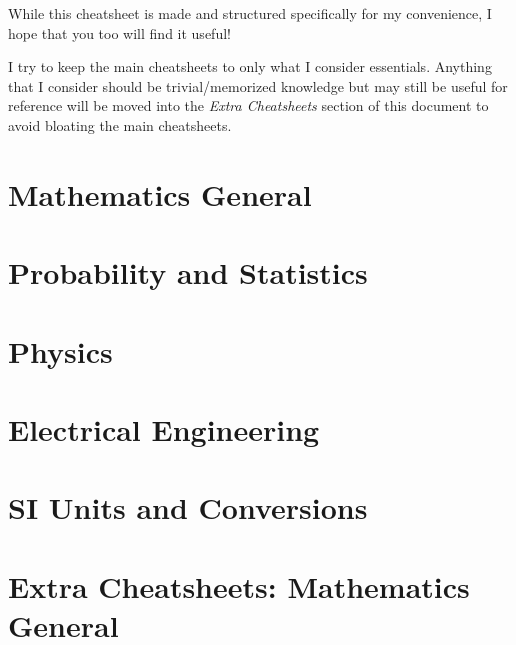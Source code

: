\documentclass{article}
\begin{document}
\thispagestyle{plain}
\MakeCustomTitle
\bigskip

\medskip
While this cheatsheet is made and structured specifically for my convenience, I hope that you too will find it useful!

I try to keep the main cheatsheets to only what I consider essentials. Anything that I consider should be trivial/memorized knowledge but may still be useful for reference will be moved into the \textit{Extra Cheatsheets} section of this document to avoid bloating the main cheatsheets.
\medskip

{
    \hypersetup{linkcolor=black}
    \tableofcontents
}

\newpage
\section{Mathematics General}
\label{sec:mathgeneral}

    

\newpage
\section{Probability and Statistics}
\label{sec:probability-and-statistics}

    

\newpage
\section{Physics}
\label{sec:physics}

    

\newpage
\section{Electrical Engineering}
\label{sec:ee}

    

\newpage
\section{SI Units and Conversions}
\label{sec:units}

    

\newpage
{}

\section{Extra Cheatsheets: Mathematics General}%
\label{sec:extrasec-mathgeneral}

    
\end{document}
